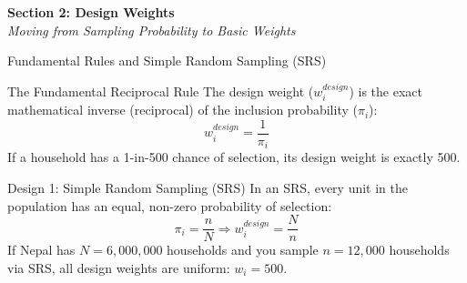 \documentclass[10pt, aspectratio=169]{beamer}
\begin{document}
{
\begin{frame}[plain, c]
  \centering
  \color{white}
  \Huge \textbf{Section 2: Design Weights} \\
  \vspace{0.4cm}
  \Large \textit{Moving from Sampling Probability to Basic Weights}
\end{frame}
}

\begin{frame}{Fundamental Rules and Simple Random Sampling (SRS)}
  \begin{block}{The Fundamental Reciprocal Rule}
    The design weight ($w_{i}^{design}$) is the exact mathematical inverse (reciprocal) of the inclusion probability ($\pi_{i}$):
    \begin{equation}
      w_{i}^{design} = \frac{1}{\pi_{i}}
    \end{equation}
    If a household has a 1-in-500 chance of selection, its design weight is exactly 500.
  \end{block}

  \begin{block}{Design 1: Simple Random Sampling (SRS)}
    In an SRS, every unit in the population has an equal, non-zero probability of selection:
    \begin{equation}
      \pi_{i} = \frac{n}{N} \Rightarrow w_{i}^{design} = \frac{N}{n}
    \end{equation}
    If Nepal has $N = 6,000,000$ households and you sample $n = 12,000$ households via SRS, all design weights are uniform: $w_i = 500$.
  \end{block}
\end{frame}
\end{document}
